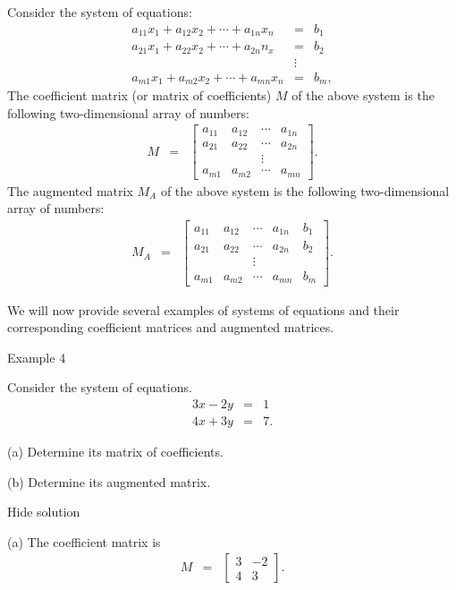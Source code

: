 Consider the system of equations: \begin{eqnarray*} a_{11}x_1+a_{12}x_2+\cdots+a_{1n}x_n&=&b_1\\ a_{21}x_1+a_{22}x_2+\cdots+a_{2n}n_x&=&b_2\\ &\vdots&\\ a_{m1}x_1+a_{m2}x_2+\cdots+a_{mn}x_n&=&b_m, \end{eqnarray*} The coefficient matrix (or matrix of coefficients) \( M \) of the above system is the following two-dimensional array of numbers: \begin{eqnarray*} M&=&\left[\begin{array}{cccc}a_{11}&a_{12}&\cdots&a_{1n}\\ a_{21}&a_{22}&\cdots&a_{2n}\\ &&\vdots&\\ a_{m1}&a_{m2}&\cdots&a_{mn}\end{array}\right]. \end{eqnarray*} The augmented matrix \( M_A \) of the above system is the following two-dimensional array of numbers: \begin{eqnarray*} M_A&=&\left[\begin{array}{ccccc}a_{11}&a_{12}&\cdots&a_{1n}&b_1\\ a_{21}&a_{22}&\cdots&a_{2n}&b_2\\ &&\vdots&&\\ a_{m1}&a_{m2}&\cdots&a_{mn}&b_m\end{array}\right]. \end{eqnarray*}

We will now provide several examples of systems of equations and their corresponding coefficient matrices and augmented matrices.

Example 4

Consider the system of equations. \begin{eqnarray*} 3x-2y&=&1\\ 4x+3y&=&7. \end{eqnarray*}

    (a) Determine its matrix of coefficients.

    (b) Determine its augmented matrix.

Hide solution

    (a) The coefficient matrix is \begin{eqnarray*} M&=&\left[\begin{array}{cc}3&-2\\ 4&3\end{array}\right].\end{eqnarray*}

